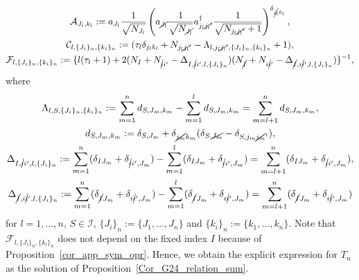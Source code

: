 \documentclass[pdftex]{sigma}
\numberwithin{equation}{section}
\begin{document}
\begin{gather*}
\mathcal{A}_{
J_{l},
k_{l}
}
:=
a_{J_{l}}
\frac{1}{\sqrt{N_{J_{l}}}}
 \left(
 a_{\cancel{J_{l}}}
 \frac{1}{
 \sqrt{
 N_{\cancel{J_{l}}}
 }
 }
 a_{j_{l}\cancel{j_{l}}'}^{\dagger}
 \frac{1}{
 \sqrt{
 N_{j_{l}\cancel{j_{l}}'}+1
 }
 }
 \right)^{\delta_{\cancel{j_{l}}k_{l}}}
,
\\
\mathcal{C}_{
l,
\{
 J_{i}
\}_{n},
\{
 k_{i}
\}_{n}
}
:=
 (
 \tau_{l}
 \delta_{j_{l}k_{l}}
 +
 N_{j_{l}\cancel{j_{l}}'}
 -
 \Lambda_{
 l,
 j_{l}\cancel{j_{l}}',
 \{
 J_{i}
 \}_{n},
 \{
 k_{i}
 \}_{n}
 }
 +
 1
 ),
\\
\mathcal{F}_{
l,
\{
 J_{i}
\}_{n},
\{
 k_{i}
\}_{n}
}
:=
\{
 l
 (
 \tau_{l}
 +
 1
 )
 +
 2
 (
 N_{I}
 +
 N_{\cancel{i}i'}
 -
 \Delta_{
 I,
 \cancel{i}i',
 l,
 \{
 J_{i}
 \}_{n}
 }
 )
 (
 N_{\cancel{I}}
 +
 N_{i\cancel{i}'}
 -
 \Delta_{
 \cancel{I},
 i\cancel{i}',
 l,
 \{
 J_{i}
 \}_{n}
 }
 )
\}^{-1},
\end{gather*}
where
\begin{gather}
\Lambda_{
 l,
 S,
 \{
 J_{i}
 \}_{n},
 \{
 k_{i}
 \}_{n}
}
:=
\sum_{m=1}^{n}
d_{
 S,
 J_{m},
 k_{m}
}
-
\sum_{m=1}^{l}
 d_{
 S,
 J_{m},
 k_{m}
}
=
\sum_{m=l+1}^{n}
d_{
 S,
 J_{m},
 k_{m}
}
,
\label{notation_Lambda}
\\
d_{
 S,
 J_{m},
 k_{m}
}
:=
\delta_{
 S,
 J_{m}
}
+
\delta_{\cancel{j_{m}}k_{m}}
 (
 \delta_{
 S,
 \cancel{J_{m}}
 }
 -
 \delta_{
 S,
 j_{m}\cancel{j_{m}}'
 }
 )
,
\label{notation_d}
\\
\Delta_{
I,
\cancel{i}i',
l,
\{
 J_{i}
\}_{n}
}
:=
\sum_{m=1}^{n}
 (
 \delta_{IJ_{m}}
 +
 \delta_{\cancel{i}i',J_{m}}
 )
-
\sum_{m=1}^{l}
 (
 \delta_{IJ_{m}}
 +
 \delta_{\cancel{i}i',J_{m}}
 )
=
\sum_{m=l+1}^{n}
 (
 \delta_{IJ_{m}}
 +
 \delta_{\cancel{i}i',J_{m}}
 )
,
\label{notation_delta_Iisi}
\\
\Delta_{
\cancel{I},
i\cancel{i}',
l,
\{
 J_{i}
\}_{n}
}
:=
\sum_{m=1}^{n}
 (
 \delta_{\cancel{I}J_{m}}
 +
 \delta_{i\cancel{i}',J_{m}}
 )
-
\sum_{m=1}^{l}
 (
 \delta_{\cancel{I}J_{m}}
 +
 \delta_{i\cancel{i}',J_{m}}
 )
=
\sum_{m=l+1}^{n}
 (
 \delta_{\cancel{I}J_{m}}
 +
 \delta_{i\cancel{i}',J_{m}}
 )
\label{notation_delta_Isiis}
\end{gather}
for $l=1,\dots,n$,
$
S
\in
\mathcal{I}
$,
$
\{
 J_{i}
\}_{n}
:=
\{
J_{1},
\dots,
J_{n}
\}
$
and
$
\{
 k_{i}
\}_{n}
:=
\{
k_{1},
\dots,
k_{n}
\}
$.
Note that
$
\mathcal{F}_{
l,
\{
 J_{i}
\}_{n},
\{
 k_{i}
\}_{n}
}
$
does not depend on the fixed index $I$ because of
Proposition~\ref{cor_app_sym_opr}.
Hence, we obtain the explicit expression for $T_{n}$ as the solution of
Proposition~\ref{Cor_G24_relation_sum}.
\end{document}

